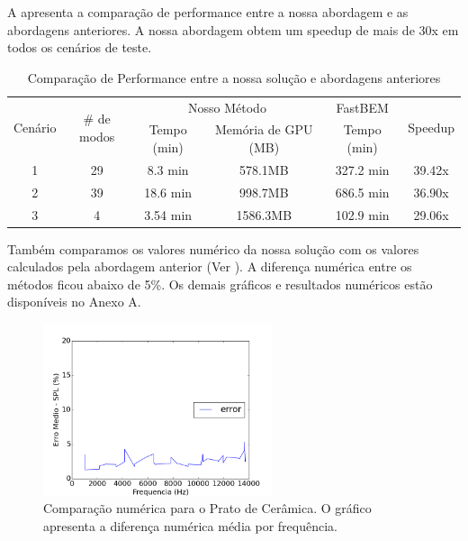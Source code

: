 A  apresenta a comparação de performance entre a nossa abordagem e as abordagens anteriores. A nossa abordagem obtem um speedup de mais de 30x em todos os cenários de teste.

\begin{table}[ht]
\begin{center}
\begin{tabular}{c|c|c c|c|c}
\multirow{2}{*}{Cenário}& \multirow{2}{*}{\# de modos} & \multicolumn{2}{c|}{Nosso Método} & FastBEM & \multirow{2}{*}{Speedup}\\
\cline{3-5}
& & Tempo (min) & Memória de GPU (MB) & Tempo (min)\\
\hline 
1 & 29 & 8.3 min & 578.1MB & 327.2 min & 39.42x\\
2 & 39 & 18.6 min & 998.7MB & 686.5 min & 36.90x\\
3 & 4 & 3.54 min & 1586.3MB & 102.9 min & 29.06x
\end{tabular}
\end{center}
\caption{Comparação de Performance entre a nossa solução e abordagens anteriores}\label{tab:benchmark_timings}
\end{table}

Também comparamos os valores numérico da nossa solução com os valores calculados pela abordagem anterior (Ver ). A diferença numérica entre os métodos ficou abaixo de 5\%. Os demais gráficos e resultados numéricos estão disponíveis no Anexo A.

\begin{figure}[ht]
\centering
\includegraphics[width=0.6\textwidth]{../data/transfer_test/ceramic_plate/plots/ceramic_plate_error.png}
\caption[Comparação numérica para o Prato de Cerâmica]{Comparação numérica para o Prato de Cerâmica. O gráfico apresenta a diferença numérica média por frequência.}
\label{fig:coef_plate_delta}
\end{figure}

